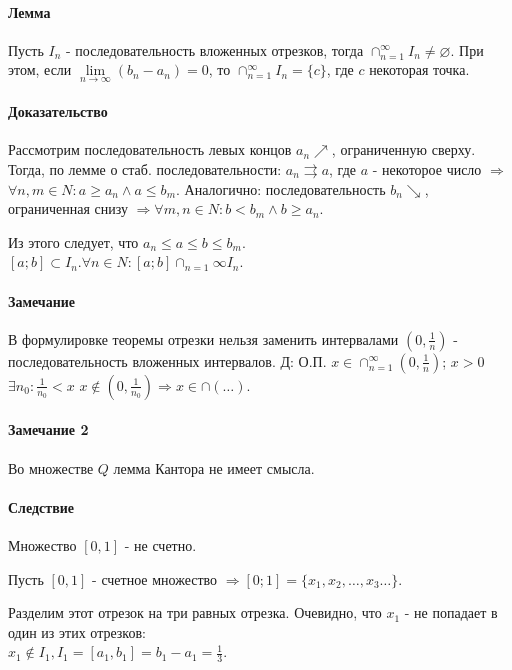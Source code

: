 \documentclass[10pt]{article}
\begin{document}
			\paragraph{Лемма}
			Пусть $I_n$ - последовательность вложенных отрезков, тогда $\cap_{n=1}^{\infty} I_n \neq \varnothing$. При этом, если $\lim\limits_{n\to\infty} (b_n - a_n) = 0$, то $\cap_{n=1}^\infty I_n = \{c\}$, где $c$ некоторая точка.
			
			\paragraph{Доказательство}
			Рассмотрим последовательность левых концов $a_n \nearrow$, ограниченную сверху. Тогда, по лемме о стаб. последовательности: $a_n \rightrightarrows a$, где $a$ - некоторое число $\Rightarrow$ $\forall n,m \in N : a \geq a_n \wedge a \le b_m$. Аналогично: последовательность $b_n \searrow$, ограниченная снизу $\Rightarrow \forall m,n \in N : b < b_m \wedge b \geq a_n$. 
			
			Из этого следует, что $a_n \le a \le b \le b_m$.\\
			$[a;b] \subset I_n. \forall n \in N : [a;b] \cap_{n=1}{\infty} I_n$.
			
			\paragraph{Замечание}
			В формулировке теоремы отрезки нельзя заменить интервалами $(0, \frac{1}{n})$ - последовательность вложенных интервалов. Д: О.П. $x \in \cap_{n=1}^\infty (0, \frac{1}{n})$; $x > 0$ $\exists n_0 : \frac{1}{n_0} < x$ $x \notin (0, \frac{1}{n_0}) \Rightarrow x \in \cap(\dots)$.
			
			\paragraph{Замечание 2}
			Во множестве $Q$ лемма Кантора не имеет смысла.
			
			\paragraph{Следствие}
			Множество $[0, 1]$ - не счетно.
			
			Пусть $[0, 1]$ - счетное множество $\Rightarrow [0;1] = \{x_1,x_2,\dots,x_3\dots\}$. 
			
			Разделим этот отрезок на три равных отрезка. Очевидно, что $x_1$ - не попадает в один из этих отрезков:\\ $x_1 \notin I_1, I_1 = [a_1, b_1] = b_1 - a_1 = \frac{1}{3}$. 
			
\end{document}
